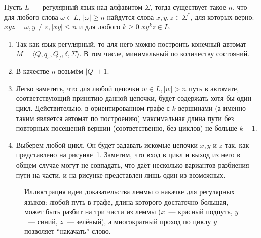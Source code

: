 \begin{lemma}
    Пусть $L$~--- регулярный язык над алфавитом $\Sigma$, тогда существует такое $n$, что для любого слова $\omega \in L$, $|\omega| \geq n$ найдутся слова $x,y,z\in \Sigma^*$, для которых верно: $xyz = \omega, y\neq \varepsilon,|xy|\leq n$ и для любого $k \geq 0$  $xy^kz \in L$.
\end{lemma}

\begin{proofSketch}
    \begin{enumerate}
        \item Так как язык регулярный, то для него можно построить конечный автомат $M = \langle Q, q_s,Q_f, \delta, \Sigma \rangle$.
              В том числе, минимальный по количеству состояний.
        \item В качестве $n$ возьмём $|Q| + 1$.
        \item Легко заметить, что для любой цепочки $w \in L, |w| > n$ путь в автомате, соответствующий принятию данной цепочки, будет содержать хотя бы один цикл.
              Действительно, в ориентированном графе с $k$ вершинами (а именно таким является автомат по построению) максимальная длина пути без повторных посещений вершин (соответственно, без циклов) не больше $k - 1$.
        \item Выберем любой цикл. Он будет задавать искомые цепочки $x, y$ и $z$ так, как представлено на рисунке~\ref{fig:reg_lang_pumping_lemma}.
              Заметим, что вход в цикл и выход из него в общем случае могут не совпадать, что даёт несколько вариантов разбиения пути на части, и на рисунке представлен лишь один из возможных.
              \qedhere
    \end{enumerate}
\end{proofSketch}

\begin{figure}
    \caption{Иллюстрация идеи доказательства леммы о накачке для регулярных языков: любой путь в графе, длина которого достаточно большая, может быть разбит на три части из леммы ($x$~--- красный подпуть, $y$~--- синий, $z$~--- зелёный), а многократный проход по циклу $y$ позволяет \enquote{накачать} слово.}
    \label{fig:reg_lang_pumping_lemma}
    \begin{center}
    \end{center}

\end{figure}


